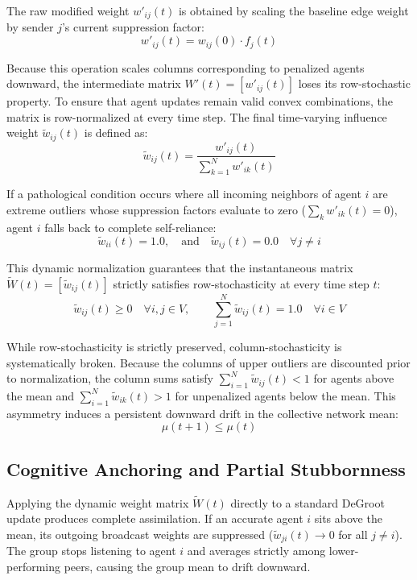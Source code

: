 The raw modified weight $w'_{ij}(t)$ is obtained by scaling the baseline edge weight by sender $j$'s current suppression factor\cite{degroot1974reaching}: $$w'_{ij}(t) = w_{ij}(0) \cdot f_j(t)$$

Because this operation scales columns corresponding to penalized agents downward, the intermediate matrix $W'(t) = [w'_{ij}(t)]$ loses its row-stochastic property\cite{degroot1974reaching}. To ensure that agent updates remain valid convex combinations, the matrix is row-normalized at every time step\cite{degroot1974reaching}. The final time-varying influence weight $\tilde{w}_{ij}(t)$ is defined as\cite{degroot1974reaching}: $$\tilde{w}_{ij}(t) = \frac{w'_{ij}(t)}{\sum_{k=1}^N w'_{ik}(t)}$$

If a pathological condition occurs where all incoming neighbors of agent $i$ are extreme outliers whose suppression factors evaluate to zero ($\sum_k w'_{ik}(t) = 0$), agent $i$ falls back to complete self-reliance\cite{degroot1974reaching}: $$\tilde{w}_{ii}(t) = 1.0, \quad \text{and} \quad \tilde{w}_{ij}(t) = 0.0 \quad \forall j \ne i$$

This dynamic normalization guarantees that the instantaneous matrix $\tilde{W}(t) = [\tilde{w}_{ij}(t)]$ strictly satisfies row-stochasticity at every time step $t$\cite{degroot1974reaching}: $$\tilde{w}_{ij}(t) \ge 0 \quad \forall i, j \in V, \qquad \sum_{j=1}^N \tilde{w}_{ij}(t) = 1.0 \quad \forall i \in V$$

While row-stochasticity is strictly preserved, column-stochasticity is systematically broken\cite{hajnal1958weak}. Because the columns of upper outliers are discounted prior to normalization, the column sums satisfy $\sum_{i=1}^N \tilde{w}_{ij}(t) < 1$ for agents above the mean and $\sum_{i=1}^N \tilde{w}_{ik}(t) > 1$ for unpenalized agents below the mean\cite{hajnal1958weak}. This asymmetry induces a persistent downward drift in the collective network mean\cite{acemoglu2013opinion,hajnal1958weak}: $$\mu(t+1) \le \mu(t)$$

\subsection{Cognitive Anchoring and Partial Stubbornness}
Applying the dynamic weight matrix $\tilde{W}(t)$ directly to a standard DeGroot update produces complete assimilation\cite{degroot1974reaching}. If an accurate agent $i$ sits above the mean, its outgoing broadcast weights are suppressed ($\tilde{w}_{ji}(t) \to 0$ for all $j \ne i$)\cite{degroot1974reaching}. The group stops listening to agent $i$ and averages strictly among lower-performing peers, causing the group mean to drift downward\cite{degroot1974reaching}.

